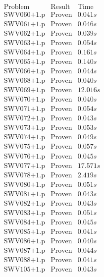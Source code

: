 \documentclass[a4paper,11pt]{report}
\theoremstyle{definition}
\theoremstyle{definition}
\theoremstyle{definition}
\theoremstyle{definition}
\theoremstyle{definition}
\theoremstyle{definition}
\theoremstyle{definition}
\begin{document}
	\begin{minipage}{0.45\textwidth}
		\[\begin{matrix}
			\text{Problem}&\text{Result}&\text{Time}\\
			\text{SWV060+1.p}&\text{Proven}& 0.041 s\\
			\text{SWV061+1.p}&\text{Proven}& 0.046 s\\
			\text{SWV062+1.p}&\text{Proven}& 0.039 s\\
			\text{SWV063+1.p}&\text{Proven}& 0.054 s\\
			\text{SWV064+1.p}&\text{Proven}& 0.161 s\\
			\text{SWV065+1.p}&\text{Proven}& 0.140 s\\
			\text{SWV066+1.p}&\text{Proven}& 0.044 s\\
			\text{SWV068+1.p}&\text{Proven}& 0.040 s\\
			\text{SWV069+1.p}&\text{Proven}& 12.016 s\\
			\text{SWV070+1.p}&\text{Proven}& 0.040 s\\
			\text{SWV071+1.p}&\text{Proven}& 0.054 s\\
			\text{SWV072+1.p}&\text{Proven}& 0.043 s\\
			\text{SWV073+1.p}&\text{Proven}& 0.053 s\\
			\text{SWV074+1.p}&\text{Proven}& 0.049 s\\
			\text{SWV075+1.p}&\text{Proven}& 0.057 s\\
			\text{SWV076+1.p}&\text{Proven}& 0.045 s\\
			\text{SWV077+1.p}&\text{Proven}& 17.571 s\\
			\text{SWV078+1.p}&\text{Proven}& 2.419 s\\
			\text{SWV080+1.p}&\text{Proven}& 0.051 s\\
			\text{SWV081+1.p}&\text{Proven}& 0.043 s\\
			\text{SWV082+1.p}&\text{Proven}& 0.043 s\\
			\text{SWV083+1.p}&\text{Proven}& 0.051 s\\
			\text{SWV084+1.p}&\text{Proven}& 0.045 s\\
			\text{SWV085+1.p}&\text{Proven}& 0.041 s\\
			\text{SWV086+1.p}&\text{Proven}& 0.040 s\\
			\text{SWV087+1.p}&\text{Proven}& 0.044 s\\
			\text{SWV088+1.p}&\text{Proven}& 0.041 s\\
			\text{SWV105+1.p}&\text{Proven}& 0.043 s\\

\end{matrix}\]
\end{minipage}
\end{document}
